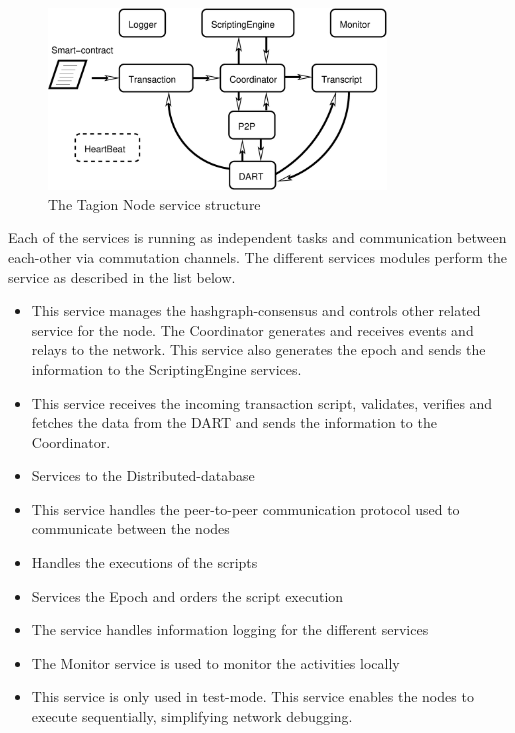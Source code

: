 \begin{figure}[H]
 \centering
 \includegraphics[width=0.8\textwidth]{fig/node_service.eps}
 \caption{The Tagion Node service structure}
 \label{fig:node_service}
\end{figure}


Each of the services is running as independent tasks and communication between each-other via commutation channels. The different services modules perform the service as described in the list below.

\begin{itemize}
 \item[\bfit{Coordinator}] This service manages the hashgraph-consensus and controls other related service for the node. 
 The Coordinator generates and receives events and relays to the network. This service also generates the epoch and sends the information to the ScriptingEngine services.
 \item[\bfit{Transaction}] This service receives the incoming transaction script, validates, verifies and fetches the data from the DART and sends the information to the Coordinator.
 \item[\bfit{DART}] Services to the Distributed-database
 \item[\bfit{P2P}] This service handles the peer-to-peer communication protocol used to communicate between the nodes
 \item[\bfit{ScriptingEngine}] Handles the executions of the scripts
 \item[\bfit{Transcript}] Services the Epoch and orders the script execution
 \item[\bfit{Logger}] The service handles information logging for the different services
 \item[\bfit{Monitor}] The Monitor service is used to monitor the activities locally
 \item[\bfit{HeartBeat}] This service is only used in test-mode. This service enables the nodes to execute sequentially, simplifying network debugging.
 \end{itemize}
